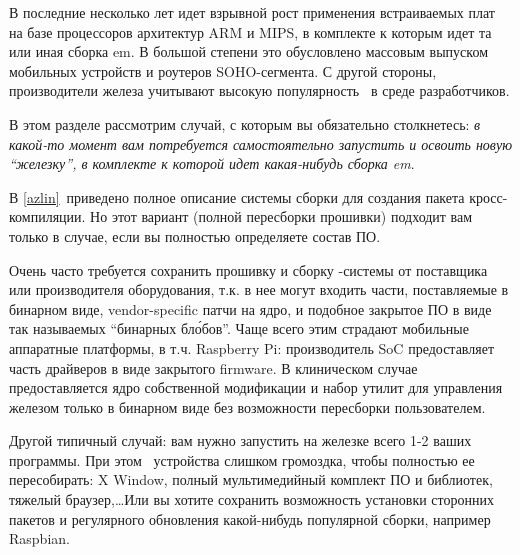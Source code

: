 \secdown

В последние несколько лет идет взрывной рост применения встраиваемых плат на
базе процессоров архитектур ARM и MIPS, в комплекте к которым идет та или иная
сборка em\linux. В большой степени это обусловлено массовым выпуском мобильных
устройств и роутеров SOHO-сегмента. С другой стороны, производители железа
учитывают высокую популярность \linux\ в среде разработчиков.

В этом разделе рассмотрим случай, с которым вы обязательно столкнетесь: \emph{в
какой-то момент вам потребуется самостоятельно запустить и освоить новую
``железку'', в комплекте к которой идет какая-нибудь сборка em\linux}.

В \ref{azlin}\ приведено полное описание системы сборки для создания пакета
кросс-компиляции. Но этот вариант (полной пересборки прошивки) подходит вам
только в случае, если вы полностью определяете состав ПО.

Очень часто требуется сохранить прошивку и сборку \linux-системы от поставщика
или производителя оборудования, т.к. в нее могут входить части, поставляемые в
бинарном виде, vendor-specific патчи на ядро, и подобное закрытое ПО в виде так
называемых ``бинарных бл\'{о}бов''. Чаще всего этим страдают мобильные
аппаратные платформы, в т.ч. Raspberry Pi: производитель
SoC предоставляет часть драйверов в виде закрытого
firmware. В клиническом случае предоставляется ядро собственной модификации и
набор утилит для управления железом только в бинарном виде без возможности
пересборки пользователем.

Другой типичный случай: вам нужно запустить на железке всего 1-2 ваших
программы. При этом  \linux\
устройства слишком громоздка, чтобы полностью ее пересобирать: X Window, полный
мультимедийный комплект ПО и библиотек, тяжелый браузер,\ldots Или вы хотите
сохранить возможность установки сторонних пакетов и регулярного обновления
какой-нибудь популярной сборки, например Raspbian.

\secup
